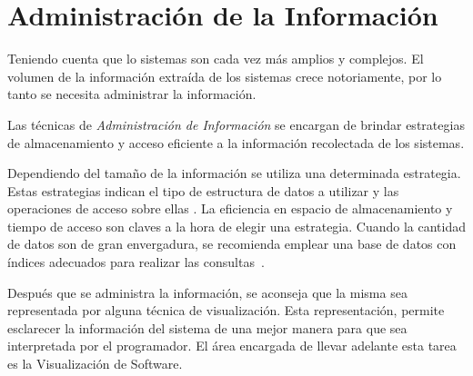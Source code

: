 

\enlargethispage{\baselineskip}%
\section{Administración de la Información}

Teniendo cuenta que lo sistemas son cada vez más amplios y complejos. El volumen de la información extraída de los sistemas crece notoriamente, por lo tanto se necesita administrar la información.

Las técnicas de \textit{Administración de Información} se encargan de brindar estrategias de almacenamiento y acceso eficiente a la información recolectada de los sistemas. 

Dependiendo del tamaño de la información se utiliza una determinada estrategia. Estas estrategias indican el tipo de estructura de datos a utilizar y las operaciones de acceso sobre ellas \cite{AAJU83,TSTA80}. La eficiencia en espacio de almacenamiento y tiempo de acceso son claves a la hora de elegir una estrategia.
Cuando la cantidad de datos son de gran envergadura, se recomienda emplear una base de datos con índices adecuados para realizar las \mbox{consultas \cite{ERNS99}.}

Después que se administra la información, se aconseja que la misma sea representada por alguna técnica de visualización. Esta representación, permite esclarecer la información del sistema de una mejor manera para que sea interpretada por el programador. El área encargada de llevar adelante esta tarea es la Visualización de Software.

